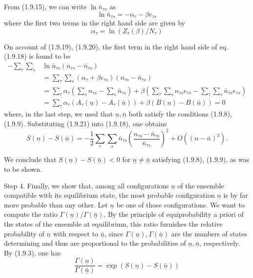 \documentclass{article}
\begin{document}
From (1.9.15), we can write $\ln \bar{n}_{\tau s}$ as
$$
\begin{equation*}
\ln \bar{n}_{\tau s}=-\alpha_{\tau}-\beta e_{\tau s} \tag{1.9.19}
\end{equation*}
$$
where the first two terms in the right hand side are given by
$$
\begin{equation*}
\alpha_{\tau}=\ln \left(Z_{\tau}(\beta) / N_{\tau}\right) \tag{1.9.20}
\end{equation*}
$$

On account of (1.9.19), (1.9.20), the first term in the right hand side of eq. (1.9.18) is found to be
$$
\begin{align*}
-\sum_{\tau} \sum_{s} & \ln \bar{n}_{\tau s}\left(n_{\tau s}-\bar{n}_{\tau s}\right)  \tag{1.9.21}\\
& =\sum_{\tau} \sum_{s}\left(\alpha_{\tau}+\beta e_{\tau s}\right)\left(n_{\tau s}-\bar{n}_{\tau s}\right) \\
& =\sum_{\tau} \alpha_{\tau}\left(\sum_{s} n_{\tau s}-\sum_{s} \bar{n}_{\tau s}\right)+\beta\left(\sum_{\tau} \sum_{s} n_{\tau s} e_{\tau s}-\sum_{\tau} \sum_{s} \bar{n}_{\tau s} e_{\tau s}\right) \\
& =\sum_{\tau} \alpha_{\tau}\left(A_{\tau}(\underline{n})-A_{\tau}(\underline{\bar{n}})\right)+\beta(B(\underline{n})-B(\underline{\bar{n}}))=0
\end{align*}
$$
where, in the last step, we used that $\underline{n}, \underline{\bar{n}}$ both satisfy the conditions (1.9.8), (1.9.9). Substituting (1.9.21) into (1.9.18), one obtains
$$
\begin{equation*}
S(\underline{n})-S(\underline{\bar{n}})=-\frac{1}{2} \sum_{\tau} \sum_{s} \bar{n}_{\tau s}\left(\frac{n_{\tau s}-\bar{n}_{\tau s}}{\bar{n}_{\tau s}}\right)^{2}+O\left((n-\bar{n})^{3}\right) . \tag{1.9.22}
\end{equation*}
$$

We conclude that $S(\underline{n})-S(\underline{\bar{n}})<0$ for $\underline{n} \neq \underline{\bar{n}}$ satisfying (1.9.8), (1.9.9), as was to be shown.

Step 4. Finally, we show that, among all configurations $\underline{n}$ of the ensemble compatible with its equilibrium state, the most probable configuration $\underline{n}$ is by far more probable than any other. Let $\underline{n}$ be one of those configurations. We want to compute the ratio $\Gamma(\underline{n}) / \Gamma(\underline{\bar{n}})$. By the principle of equiprobability a priori of the states of the ensemble at equilibrium, this ratio furnishes the relative probability of $\underline{n}$ with respect to $\underline{\bar{n}}$, since $\Gamma(\underline{n}), \Gamma(\underline{\bar{n}})$ are the numbers of states determining and thus are proportional
to the probabilities of $\underline{n}, \underline{\bar{n}}$, respectively. By (1.9.3), one has
$$
\begin{equation*}
\frac{\Gamma(\underline{n})}{\Gamma(\underline{\bar{n}})}=\exp (S(\underline{n})-S(\underline{\bar{n}})) \tag{1.9.23}
\end{equation*}
$$
\end{document}
